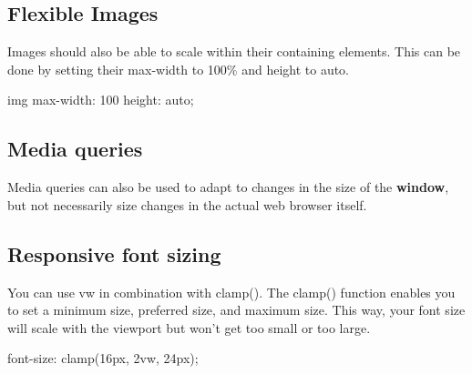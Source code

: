 \documentclass{report}
\begin{document}
    \bigbreak \noindent 
    \subsection{Flexible Images}
    \bigbreak \noindent 
    Images should also be able to scale within their containing elements. This can be done by setting their max-width to 100\% and height to auto.
    \bigbreak \noindent 
    \begin{csscode}
    img {
        max-width: 100%
        height: auto;
    }
    \end{csscode}

    \bigbreak \noindent 
    \subsection{Media queries}
    \bigbreak \noindent 
    Media queries can also be used to adapt to changes in the size of the \textbf{window}, but not necessarily size changes in the actual web browser itself.

    \bigbreak \noindent 
    \subsection{Responsive font sizing}
    \bigbreak \noindent 
    You can use vw in combination with clamp(). The clamp() function enables you to set a minimum size, preferred size, and maximum size. This way, your font size will scale with the viewport but won't get too small or too large.
    \bigbreak \noindent 
    \begin{csscode}
    font-size: clamp(16px, 2vw, 24px);
    \end{csscode}









    
    










    



























    
\end{document}
